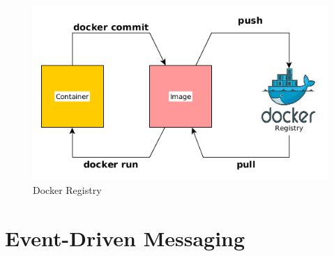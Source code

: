 \begin{description}
 \begin{figure}[H]
 \centering
 \includegraphics[scale=0.7]{5-patterns/images/docker-registry.png}
 \caption{Docker Registry}
 \label{fig:docker-registry}
 \end{figure}

\end{description}

\section{Event-Driven Messaging}

